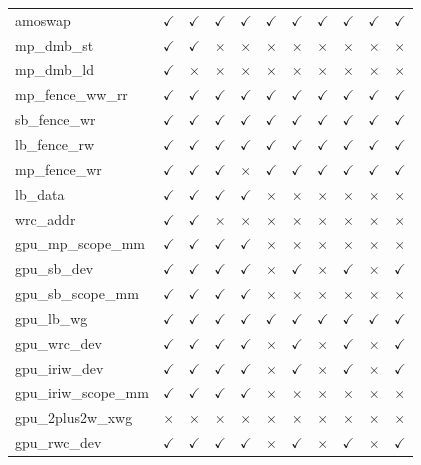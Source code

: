 \documentclass[11pt]{article}
\newcommand{\cmark}{$\checkmark$}
\newcommand{\xmark}{$\times$}
\begin{document}
{\begin{longtable}{l cccc cccccc}
amoswap & \cmark & \cmark & \cmark & \cmark & \cmark & \cmark & \cmark & \cmark & \cmark & \cmark \\
mp\_dmb\_st & \cmark & \cmark & \xmark & \xmark & \xmark & \xmark & \xmark & \xmark & \xmark & \xmark \\
mp\_dmb\_ld & \cmark & \xmark & \xmark & \xmark & \xmark & \xmark & \xmark & \xmark & \xmark & \xmark \\
mp\_fence\_ww\_rr & \cmark & \cmark & \cmark & \cmark & \cmark & \cmark & \cmark & \cmark & \cmark & \cmark \\
sb\_fence\_wr & \cmark & \cmark & \cmark & \cmark & \cmark & \cmark & \cmark & \cmark & \cmark & \cmark \\
lb\_fence\_rw & \cmark & \cmark & \cmark & \cmark & \cmark & \cmark & \cmark & \cmark & \cmark & \cmark \\
mp\_fence\_wr & \cmark & \cmark & \cmark & \xmark & \cmark & \cmark & \cmark & \cmark & \cmark & \cmark \\
lb\_data & \cmark & \cmark & \cmark & \cmark & \xmark & \xmark & \xmark & \xmark & \xmark & \xmark \\
wrc\_addr & \cmark & \cmark & \xmark & \xmark & \xmark & \xmark & \xmark & \xmark & \xmark & \xmark \\
gpu\_mp\_scope\_mm & \cmark & \cmark & \cmark & \cmark & \xmark & \xmark & \xmark & \xmark & \xmark & \xmark \\
gpu\_sb\_dev & \cmark & \cmark & \cmark & \cmark & \xmark & \cmark & \xmark & \cmark & \xmark & \cmark \\
gpu\_sb\_scope\_mm & \cmark & \cmark & \cmark & \cmark & \xmark & \xmark & \xmark & \xmark & \xmark & \xmark \\
gpu\_lb\_wg & \cmark & \cmark & \cmark & \cmark & \cmark & \cmark & \cmark & \cmark & \cmark & \cmark \\
gpu\_wrc\_dev & \cmark & \cmark & \cmark & \cmark & \xmark & \cmark & \xmark & \cmark & \xmark & \cmark \\
gpu\_iriw\_dev & \cmark & \cmark & \cmark & \cmark & \xmark & \cmark & \xmark & \cmark & \xmark & \cmark \\
gpu\_iriw\_scope\_mm & \cmark & \cmark & \cmark & \cmark & \xmark & \xmark & \xmark & \xmark & \xmark & \xmark \\
gpu\_2plus2w\_xwg & \xmark & \xmark & \xmark & \xmark & \xmark & \xmark & \xmark & \xmark & \xmark & \xmark \\
gpu\_rwc\_dev & \cmark & \cmark & \cmark & \cmark & \xmark & \cmark & \xmark & \cmark & \xmark & \cmark \\

\end{longtable}}
\end{document}
